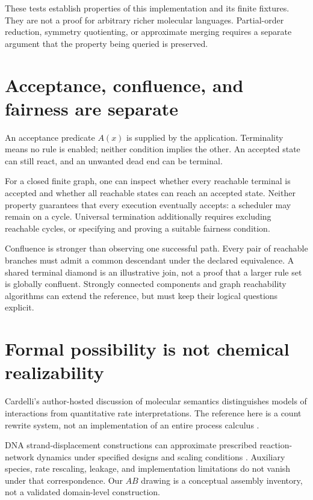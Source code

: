 These tests establish properties of this implementation and its finite fixtures.
They are not a proof for arbitrary richer molecular languages. Partial-order
reduction, symmetry quotienting, or approximate merging requires a separate
argument that the property being queried is preserved.

\section{Acceptance, confluence, and fairness are separate}
An acceptance predicate $A(x)$ is supplied by the application. Terminality means
no rule is enabled; neither condition implies the other. An accepted state can
still react, and an unwanted dead end can be terminal.

For a closed finite graph, one can inspect whether every reachable terminal is
accepted and whether all reachable states can reach an accepted state. Neither
property guarantees that every execution eventually accepts: a scheduler may
remain on a cycle. Universal termination additionally requires excluding reachable
cycles, or specifying and proving a suitable fairness condition.

Confluence is stronger than observing one successful path. Every pair of reachable
branches must admit a common descendant under the declared equivalence. A shared
terminal diamond is an illustrative join, not a proof that a larger rule set is
globally confluent. Strongly connected components and graph reachability algorithms
can extend the reference, but must keep their logical questions explicit.

\section{Formal possibility is not chemical realizability}
Cardelli's author-hosted discussion of molecular semantics distinguishes models
of interactions from quantitative rate interpretations. The reference here is
a count rewrite system, not an implementation of an entire process calculus
\cite{cardelli-site}.

DNA strand-displacement constructions can approximate prescribed reaction-network
dynamics under specified designs and scaling conditions \cite{soloveichik2010}.
Auxiliary species, rate rescaling, leakage, and implementation limitations do not
vanish under that correspondence. Our $AB$ drawing is a conceptual assembly
inventory, not a validated domain-level construction.

